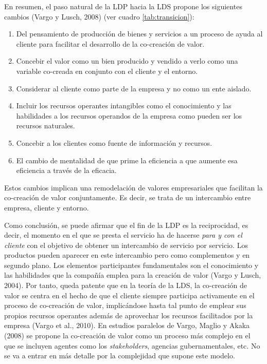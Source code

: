 En resumen, el paso natural de la LDP hacia la LDS propone los siguientes cambios (Vargo y Lusch, 2008) (ver cuadro \ref{tab:transicion}): 

\begin{enumerate} 
			\item Del pensamiento de producción de bienes y servicios a un proceso de ayuda al cliente para facilitar el desarrollo de la co-creación de valor. 
			\item Concebir el valor como un bien producido y vendido a verlo como una variable co-creada en conjunto con el cliente y el entorno. 
			\item Considerar al cliente como parte de la empresa y no como un ente aislado.
			\item Incluir los recursos operantes intangibles como el conocimiento y las habilidades a los recursos operandos de la empresa como pueden ser los recursos naturales. 
			\item Concebir a los clientes como fuente de información y recursos. 
			\item El cambio de mentalidad de que prime la eficiencia a que aumente esa eficiencia a través de la eficacia. 

\end{enumerate}



Estos cambios implican una remodelación de valores empresariales que facilitan la co-creación de valor conjuntamente. Es decir, se trata de un intercambio entre empresa, cliente y entorno. 

Como conclusión, se puede afirmar que el fin de la LDP es la reciprocidad, es decir, el momento en el que se presta el servicio ha de hacerse \emph{para y con el cliente} con el objetivo de obtener un intercambio de servicio por servicio.  Los productos pueden aparecer en este intercambio pero como complementos y en segundo plano. Los elementos participantes fundamentales son el conocimiento y las habilidades que la compañía emplea para la creación de valor (Vargo y Lusch, 2004). Por tanto, queda patente que en la teoría de la LDS, la co-creación de valor se centra en el hecho de que el cliente siempre participa activamente en el proceso de co-creación de valor, implicándose hasta tal punto de emplear sus propios recursos operantes además de aprovechar los recursos facilitados por la empresa (Vargo et al., 2010). En estudios paralelos de Vargo, Maglio y Akaka (2008) se propone la co-creación de valor como un proceso más complejo en el que se incluyen agentes como los \emph{stakeholders}, agencias gubernamentales, etc. No se va a entrar en más detalle por la complejidad que supone este modelo.

